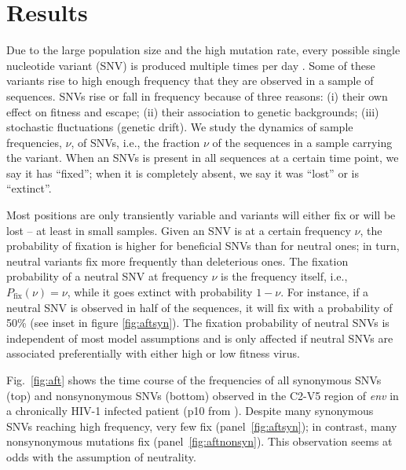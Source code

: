 \documentclass[11pt]{article}
\newcommand{\pfix}{P_{\mathrm{fix}}}
\newcommand{\FIG}[1]{Fig.~\ref{fig:#1}}
\newcommand{\env}{\textit{env}}
\newcommand{\shankaregion}{C2-V5}
\begin{document}
\section*{Results}
Due to the large population size and the high mutation rate, every
possible single nucleotide variant (SNV) is produced multiple times per
day \citep{coffin_hiv_1995}. Some of these variants rise to high enough
frequency that they are observed in a sample of sequences. SNVs rise or fall in 
frequency because of three reasons: (i) their own effect on fitness and escape; (ii)
their association to genetic backgrounds; (iii) stochastic fluctuations
(genetic drift). We study the dynamics of sample frequencies, $\nu$, of SNVs,
i.e., the fraction $\nu$ of the sequences in a sample carrying
the variant. When an SNVs is present in all sequences 
at a certain time point, we say it has ``fixed''; when it is completely absent,
we say it was ``lost'' or is ``extinct''. 

Most positions are only transiently variable and variants will either fix or
will be lost -- at least in small samples. Given an SNV is at a certain
frequency $\nu$, the probability of fixation is higher for beneficial
SNVs than for neutral ones; in turn, neutral variants fix more frequently than
deleterious ones. The fixation probability of a
neutral SNV at frequency $\nu$ is the frequency itself, i.e.,
$\pfix(\nu) = \nu$, while it goes extinct with probability $1-\nu$. For
instance, if a neutral SNV is observed in half of the sequences, it will
fix with a probability of 50\% (see inset in figure
\ref{fig:aftsyn}). The fixation probability of neutral SNVs is
independent of most model assumptions and is only affected if neutral
SNVs are associated preferentially with either high or low fitness
virus.

\FIG{aft} shows the time course of the frequencies of all synonymous
SNVs (top) and nonsynonymous SNVs (bottom) observed in the
\shankaregion{} region of \env{} in a chronically HIV-1 infected patient (p10 from
\citet{shankarappa_consistent_1999}). Despite many synonymous SNVs
reaching high frequency, very few fix (panel~\ref{fig:aftsyn}); in
contrast, many nonsynonymous mutations fix
(panel~\ref{fig:aftnonsyn}). This observation seems at odds with
the assumption of neutrality.

\end{document}
